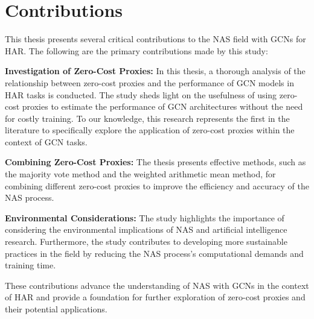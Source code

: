 \section{Contributions}

This thesis presents several critical contributions to the NAS field with GCNs for HAR. The following are the primary contributions made by this study:

\textbf{Investigation of Zero-Cost Proxies:} In this thesis, a thorough analysis of the relationship between zero-cost proxies and the performance of GCN models in HAR tasks is conducted. The study sheds light on the usefulness of using zero-cost proxies to estimate the performance of GCN architectures without the need for costly training. To our knowledge, this research represents the first in the literature to specifically explore the application of zero-cost proxies within the context of GCN tasks.

\textbf{Combining Zero-Cost Proxies:} The thesis presents effective methods, such as the majority vote method and the weighted arithmetic mean method, for combining different zero-cost proxies to improve the efficiency and accuracy of the NAS process. 

\textbf{Environmental Considerations:} The study highlights the importance of considering the environmental implications of NAS and artificial intelligence research. Furthermore, the study contributes to developing more sustainable practices in the field by reducing the NAS process's computational demands and training time.

\begin{comment}
    
\textbf{Identification of Limitations and Future Research Directions:} The thesis acknowledges the current study's limitations and provides a roadmap for future research to address these limitations.
\end{comment}

These contributions advance the understanding of NAS with GCNs in the context of HAR and provide a foundation for further exploration of zero-cost proxies and their potential applications.